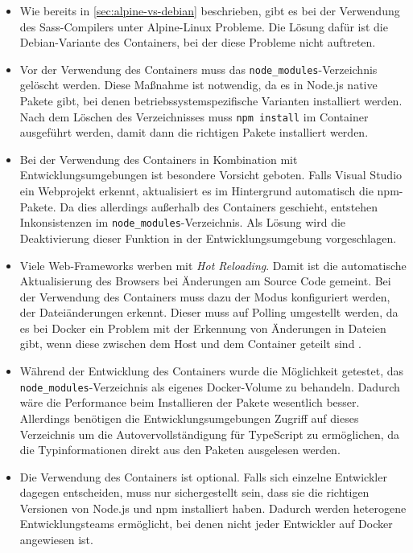 \begin{itemize}
    \item Wie bereits in \cref{sec:alpine-vs-debian} beschrieben, gibt es bei der Verwendung des Sass-Compilers unter Alpine-Linux Probleme.
        Die Lösung dafür ist die Debian-Variante des Containers, bei der diese Probleme nicht auftreten.
    \item Vor der Verwendung des Containers muss das \verb|node_modules|-Verzeichnis gelöscht werden.
        Diese Maßnahme ist notwendig, da es in Node.js native Pakete gibt, bei denen betriebssystemspezifische Varianten installiert werden.
        Nach dem Löschen des Verzeichnisses muss \verb|npm install| im Container ausgeführt werden, damit dann die richtigen Pakete installiert werden.
    \item Bei der Verwendung des Containers in Kombination mit Entwicklungsumgebungen ist besondere Vorsicht geboten.
        Falls \zB Visual Studio ein Webprojekt erkennt, aktualisiert es im Hintergrund automatisch die npm-Pakete.
        Da dies allerdings außerhalb des Containers geschieht, entstehen Inkonsistenzen im \verb|node_modules|-Verzeichnis.
        Als Lösung wird die Deaktivierung dieser Funktion in der Entwicklungsumgebung vorgeschlagen.
    \item Viele Web-Frameworks werben mit \emph{Hot Reloading}.
        Damit ist die automatische Aktualisierung des Browsers bei Änderungen am Source Code gemeint.
        Bei der Verwendung des Containers muss dazu der Modus konfiguriert werden, der Dateiänderungen erkennt.
        Dieser muss auf Polling umgestellt werden, da es bei Docker ein Problem mit der Erkennung von Änderungen in Dateien gibt, wenn diese zwischen dem Host und dem Container geteilt sind \autocite{Docker.inotify-problem:online}. 
    \item Während der Entwicklung des Containers wurde die Möglichkeit getestet, das \verb|node_modules|-Verzeichnis als eigenes Docker-Volume zu behandeln.
        Dadurch wäre die Performance beim Installieren der Pakete wesentlich besser.
        Allerdings benötigen die Entwicklungsumgebungen Zugriff auf dieses Verzeichnis um die Autovervollständigung für TypeScript zu ermöglichen, da die Typinformationen direkt aus den Paketen ausgelesen werden.
    \item Die Verwendung des Containers ist optional.
        Falls sich einzelne Entwickler dagegen entscheiden, muss nur sichergestellt sein, dass sie die richtigen Versionen von Node.js und npm installiert haben.
        Dadurch werden heterogene Entwicklungsteams ermöglicht, bei denen nicht jeder Entwickler auf Docker angewiesen ist.
\end{itemize}
